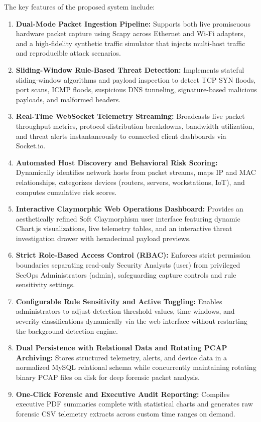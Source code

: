\documentclass[a4paper,12pt]{report}
\begin{document}
	The key features of the proposed system include:
	\begin{enumerate}
		\item \textbf{Dual-Mode Packet Ingestion Pipeline:}
		Supports both live promiscuous hardware packet capture using Scapy across Ethernet and Wi-Fi adapters, and a high-fidelity synthetic traffic simulator that injects multi-host traffic and reproducible attack scenarios.
		
		\item \textbf{Sliding-Window Rule-Based Threat Detection:}
		Implements stateful sliding-window algorithms and payload inspection to detect TCP SYN floods, port scans, ICMP floods, suspicious DNS tunneling, signature-based malicious payloads, and malformed headers.
		
		\item \textbf{Real-Time WebSocket Telemetry Streaming:}
		Broadcasts live packet throughput metrics, protocol distribution breakdowns, bandwidth utilization, and threat alerts instantaneously to connected client dashboards via Socket.io.
		
		\item \textbf{Automated Host Discovery and Behavioral Risk Scoring:}
		Dynamically identifies network hosts from packet streams, maps IP and MAC relationships, categorizes devices (routers, servers, workstations, IoT), and computes cumulative risk scores.
		
		\item \textbf{Interactive Claymorphic Web Operations Dashboard:}
		Provides an aesthetically refined Soft Claymorphism user interface featuring dynamic Chart.js visualizations, live telemetry tables, and an interactive threat investigation drawer with hexadecimal payload previews.
		
		\item \textbf{Strict Role-Based Access Control (RBAC):}
		Enforces strict permission boundaries separating read-only Security Analysts (user) from privileged SecOps Administrators (admin), safeguarding capture controls and rule sensitivity settings.
		
		\item \textbf{Configurable Rule Sensitivity and Active Toggling:}
		Enables administrators to adjust detection threshold values, time windows, and severity classifications dynamically via the web interface without restarting the background detection engine.
		
		\item \textbf{Dual Persistence with Relational Data and Rotating PCAP Archiving:}
		Stores structured telemetry, alerts, and device data in a normalized MySQL relational schema while concurrently maintaining rotating binary PCAP files on disk for deep forensic packet analysis.
		
		\item \textbf{One-Click Forensic and Executive Audit Reporting:}
		Compiles executive PDF summaries complete with statistical charts and generates raw forensic CSV telemetry extracts across custom time ranges on demand.
	\end{enumerate}
	
\end{document}
